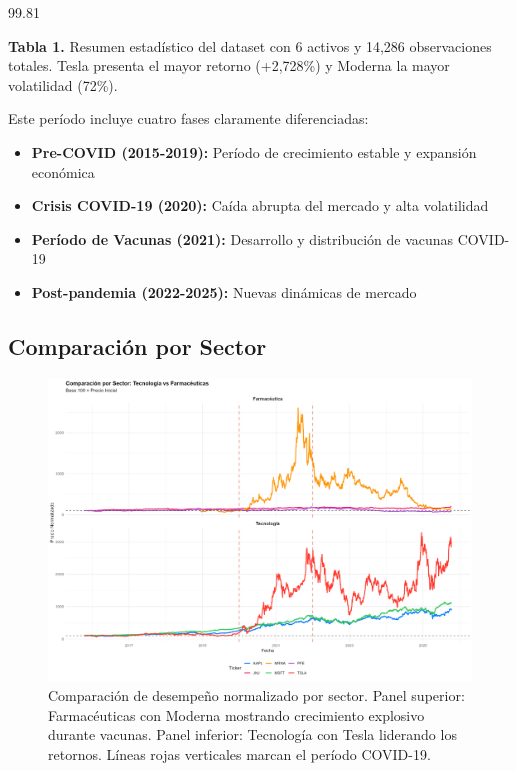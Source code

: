 \documentclass[
]{book}
\providecommand{\tightlist}{%
  \setlength{\itemsep}{0pt}\setlength{\parskip}{0pt}}
\begin{document}
99.81

\textbf{Tabla 1.} Resumen estadístico del dataset con 6 activos y 14,286 observaciones totales. Tesla presenta el mayor retorno (+2,728\%) y Moderna la mayor volatilidad (72\%).

Este período incluye cuatro fases claramente diferenciadas:

\begin{itemize}
\tightlist
\item
  \textbf{Pre-COVID (2015-2019):} Período de crecimiento estable y expansión económica
\item
  \textbf{Crisis COVID-19 (2020):} Caída abrupta del mercado y alta volatilidad
\item
  \textbf{Período de Vacunas (2021):} Desarrollo y distribución de vacunas COVID-19
\item
  \textbf{Post-pandemia (2022-2025):} Nuevas dinámicas de mercado
\end{itemize}

\subsection{Comparación por Sector}\label{comparaciuxf3n-por-sector}

\begin{figure}
\includegraphics[width=1\linewidth]{graficos/03_comparacion_sector} \caption{Comparación de desempeño normalizado por sector. Panel superior: Farmacéuticas con Moderna mostrando crecimiento explosivo durante vacunas. Panel inferior: Tecnología con Tesla liderando los retornos. Líneas rojas verticales marcan el período COVID-19.}\label{fig:figura-sectores}
\end{figure}
\end{document}
